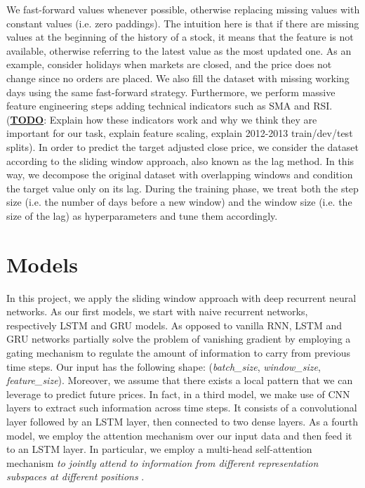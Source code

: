\documentclass{article}
\begin{document}
We fast-forward values whenever possible, otherwise replacing missing values with constant values (i.e. zero paddings). The intuition here is that if there are missing values at the beginning of the history of a stock, it means that the feature is not available, otherwise referring to the latest value as the most updated one. As an example, consider holidays when markets are closed, and the price does not change since no orders are placed. We also fill the dataset with missing working days using the same fast-forward strategy. Furthermore, we perform massive feature engineering steps adding technical indicators such as SMA and RSI. (\underline{\textbf{TODO}}: Explain how these indicators work and why we think they are important for our task, explain feature scaling, explain 2012-2013 train/dev/test splits). In order to predict the target adjusted close price, we consider the dataset according to the sliding window approach, also known as the lag method. In this way, we decompose the original dataset with overlapping windows and condition the target value only on its lag. During the training phase, we treat both the step size (i.e. the number of days before a new window) and the window size (i.e. the size of the lag) as hyperparameters and tune them accordingly.

\section{Models}

In this project, we apply the sliding window approach with deep recurrent neural networks. As our first models, we start with naive recurrent networks, respectively LSTM and GRU models. As opposed to vanilla RNN, LSTM and GRU networks partially solve the problem of vanishing gradient by employing a gating mechanism to regulate the amount of information to carry from previous time steps. Our input has the following shape: (\emph{batch\_size}, \emph{window\_size}, \emph{feature\_size}). Moreover, we assume that there exists a local pattern that we can leverage to predict future prices. In fact, in a third model, we make use of CNN layers to extract such information across time steps. It consists of a convolutional layer followed by an LSTM layer, then connected to two dense layers. As a fourth model, we employ the attention mechanism over our input data and then feed it to an LSTM layer. In particular, we employ a multi-head self-attention mechanism \emph{to jointly attend to information from different representation subspaces at different positions} \cite{46201}.
\end{document}
